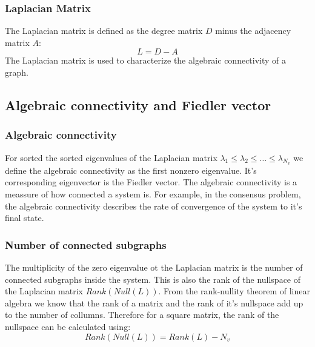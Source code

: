 \documentclass[a4paper,twoside, openright,12pt]{report}
\begin{document}
\subsubsection{Laplacian Matrix}
The Laplacian matrix is defined as the degree matrix $D$ minus the adjacency matrix $A$:
\begin{equation}
 L = D - A
\end{equation} 
The Laplacian matrix is used to characterize the algebraic connectivity of a graph.

\subsection{Algebraic connectivity and Fiedler vector}
\subsubsection{Algebraic connectivity}
For sorted the sorted eigenvalues of the Laplacian matrix
$ \lambda_1 \leq \lambda_2 \leq \ldots \leq \lambda_{N_v} $
we define the algebraic connectivity as the first nonzero eigenvalue. It's corresponding eigenvector is the Fiedler vector.
The algebraic connectivity is a meassure of how connected a system is. For example, in the consensus problem, the algebraic connectivity describes the rate of convergence of the system to it's final state. 

\subsubsection{Number of connected subgraphs}
The multiplicity of the zero eigenvalue ot the Laplacian matrix is the number of connected subgraphs inside the system. This is also the rank of the nullspace of the Laplacian matrix
$Rank( {Null}(L)) $.
From the rank-nullity theorem of linear algebra we know that the rank of a matrix and the rank of it's nullspace add up to the number of collumns. Therefore for a square matrix, the rank of the nullspace can be calculated using:
 \begin{equation}
 Rank( {Null}(L) ) = Rank(L) - N_v
\end{equation} 

%
%
\pagebreak 
\end{document}
